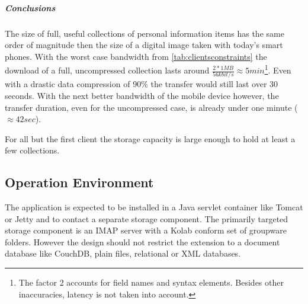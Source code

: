 \documentclass[11pt,a4paper,headsepline,twoside]{scrartcl}		%
\begin{document}
\subparagraph{Conclusions} The size of full, useful collections of personal
information items has the same order of magnitude then the size of a digital
image taken with today's smart phones. With the worst case bandwidth from
\autoref{tab:clientsconstraints} the download of a full, uncompressed collection
lasts around $\frac{2 * 1MB}{56kbit/s} \approx 5min$\footnote{The factor 2
  accounts for field names and syntax elements. Besides other inaccuracies,
  latency is not taken into account.}. Even with a drastic data compression of
90\% the transfer would still last over 30 seconds. With the next better
bandwidth of the mobile device however, the transfer duration, even for the
uncompressed case, is already under one minute ($\approx 42 sec$).

For all but the first client the storage capacity is large enough to hold at
least a few collections.

\subsection{Operation Environment}

The application is expected to be installed in a Java servlet container like
Tomcat or Jetty and to contact a separate storage component. The primarily
targeted storage component is an IMAP server with a Kolab conform set of
groupware folders. However the design should not restrict the extension to a
document database like CouchDB, plain files, relational or XML databases.




\end{document}
